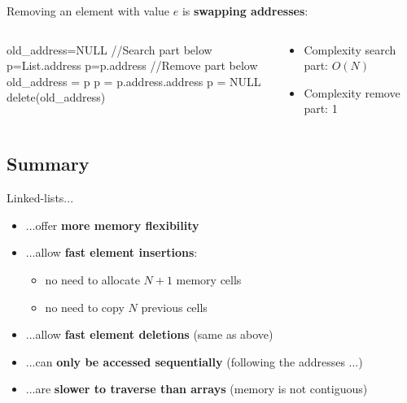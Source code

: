 \documentclass{beamer}[10pt, usepdftitle=false, handout]
\begin{document}
	\begin{frame}	
	Removing an element with value $e$ is \textbf{swapping addresses}:
	
	\begin{columns}[c]
	\begin{center}    
    \scalebox{0.7} {
    \begin{algorithm}[H]
    \vspace*{1em}
    old\_address=NULL\;
    \vspace*{1em}
    //Search part below \\
    p=List.address\;
     {  
     	 {
    	   	p=p.address\;
		}
	}
	\vspace*{1em}
	//Remove part below \\ 
	 {
		old\_address = p\;
		 {
			p = p.address.address\;
		} {
			p = NULL\;
		}
		delete(old\_address)\;    	
    }
	\end{algorithm}	
	}
	\end{center}
	\begin{center}
	\begin{itemize}
		\item {Complexity search part: $O(N)$}
		\item {Complexity remove part: 1}
	\end{itemize}	
	\end{center}
	\end{columns}	
	
	\end{frame}
	
	\subsection{Summary}
	
	\begin{frame}
		Linked-lists...
		
		\begin{itemize}
		\item {...offer \textbf{more memory flexibility}}
		\item {...allow \textbf{fast element insertions}:
			\begin{itemize}
				\item {no need to allocate $N+1$ memory cells}
				\item {no need to copy $N$ previous cells}
			\end{itemize}		
		}
		\item {...allow \textbf{fast element deletions} (same as above)}
		\item {...can \textbf{only be accessed sequentially} (following the addresses ...)}
		\item {...are \textbf{slower to traverse than arrays} (memory is not contiguous)}
		\end{itemize}
	
	\end{frame}	
	
\end{document}
